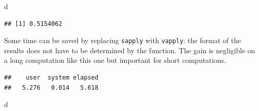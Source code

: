 \documentclass[
  12pt,
  american,
  a4paper,
  extrafontsizes,onecolumn,openright
  ]{memoir}
\newenvironment{Shaded}{\begin{snugshade}}{\end{snugshade}}
\newcommand{\ControlFlowTok}[1]{\textcolor[rgb]{0.13,0.29,0.53}{\textbf{#1}}}
\newcommand{\DecValTok}[1]{\textcolor[rgb]{0.00,0.00,0.81}{#1}}
\newcommand{\FunctionTok}[1]{\textcolor[rgb]{0.00,0.00,0.00}{#1}}
\newcommand{\NormalTok}[1]{#1}
\newcommand{\OtherTok}[1]{\textcolor[rgb]{0.56,0.35,0.01}{#1}}
\newcommand{\SpecialCharTok}[1]{\textcolor[rgb]{0.00,0.00,0.00}{#1}}
\begin{document}
\begin{Shaded}
\begin{Highlighting}[]
\NormalTok{d}
\end{Highlighting}
\end{Shaded}

\begin{verbatim}
## [1] 0.5154062
\end{verbatim}

\normalsize

Some time can be saved by replacing \texttt{sapply} with \texttt{vapply}: the format of the results does not have to be determined by the function.
The gain is negligible on a long computation like this one but important for short computations.

\scriptsize

\begin{Shaded}
\end{Shaded}

\begin{verbatim}
##    user  system elapsed 
##   5.276   0.014   5.618
\end{verbatim}

\begin{Shaded}
\begin{Highlighting}[]
\NormalTok{d}
\end{Highlighting}
\end{Shaded}
\end{document}
